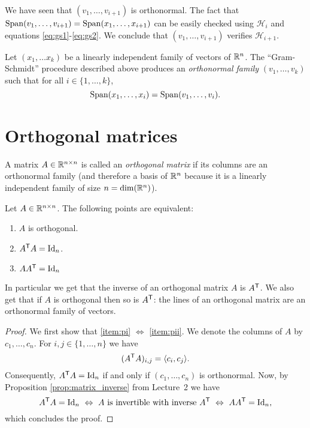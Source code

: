 \documentclass[11pt,nocut]{article}
\begin{document}
We have seen that $(v_1, \dots, v_{i+1})$ is orthonormal. The fact that ${{\rm Span}}(v_1, \dots, v_{i+1}) = {{\rm Span}}(x_1, \dots, x_{i+1})$ can be easily checked using $\mathcal{H}_i$ and equations \eqref{eq:gs1}-\eqref{eq:gs2}. We conclude that $(v_1, \dots, v_{i+1})$ verifies $\mathcal{H}_{i+1}$.

\begin{theorem}\label{th:gram_schmidt}
	Let $(x_1, \dots x_k)$ be a linearly independent family of vectors of $\mathbb{R}^n$. The ``Gram-Schmidt'' procedure described above produces an \emph{orthonormal family} $(v_1, \dots, v_k)$ such that for all $i \in \{1, \dots, k\}$,
	$$
	{{\rm Span}}(x_1, \dots, x_i) = {{\rm Span}}(v_1, \dots, v_i).
	$$
\end{theorem}

\section{Orthogonal matrices}

\begin{definition}
	A matrix $A \in \mathbb{R}^{n \times n}$ is called an \emph{orthogonal matrix} if its columns are an orthonormal family (and therefore a basis of $\mathbb{R}^n$ because it is a linearly independent family of size $n = {{\rm dim}}(\mathbb{R}^n)$).
\end{definition}

\begin{proposition}\label{prop:equiv_orthogonal}
	Let $A \in \mathbb{R}^{n \times n}$. The following points are equivalent:
	\begin{enumerate}[label=(\roman*)]
		\item \label{item:pi} $A$ is orthogonal.
		\item \label{item:pii} $A^{{\sf T}} A = {{\rm Id}}_n$.
		\item \label{item:piii} $A A^{{\sf T}} = {{\rm Id}}_n$
	\end{enumerate}
\end{proposition}
In particular we get that the inverse of an orthogonal matrix $A$ is $A^{{\sf T}}$. We also get that if $A$ is orthogonal then so is $A^{{\sf T}}$: the lines of an orthogonal matrix are an orthonormal family of vectors.
\\

\begin{proof}
	We first show that \ref{item:pi} $\Leftrightarrow$ \ref{item:pii}. We denote the columns of $A$ by $c_1, \dots, c_n$. For $i,j \in \{1 ,\dots, n \}$ we have
	$$
	(A^{{\sf T}}A)_{i,j} = \langle c_i, c_j \rangle.
	$$
	Consequently, $A^{{\sf T}} A = {{\rm Id}}_n$ if and only if $(c_1, \dots, c_n)$ is orthonormal. 
	Now, by Proposition \ref{prop:matrix_inverse} from Lecture~2 we have
	$$
		A^{{\sf T}} A = {{\rm Id}}_n
		\ \Leftrightarrow \
		A \ \text{is invertible with inverse} \ A^{{\sf T}}
		\ \Leftrightarrow \
		A A^{{\sf T}} = {{\rm Id}}_n,
	$$
	which concludes the proof.
\end{proof}
\end{document}
